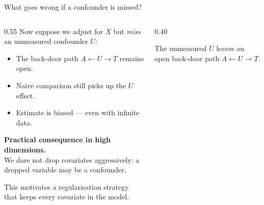 \documentclass[10pt,aspectratio=169]{beamer}
\begin{document}
\begin{frame}{What goes wrong if a confounder is missed?}
\begin{columns}[T,onlytextwidth]
\begin{column}{0.55\textwidth}
Now suppose we adjust for $X$ but \emph{miss} an unmeasured confounder $U$:

\bigskip

\begin{itemize}
  \item The back-door path $A \leftarrow U \rightarrow T$ remains open.
  \item Naive comparison still picks up the $U$ effect.
  \item \alert{Estimate is biased — even with infinite data.}
\end{itemize}

\bigskip

\textbf{Practical consequence in high dimensions.}\\
We dare not drop covariates aggressively: a dropped variable may be a confounder.

\bigskip

This motivates a regularisation strategy that \alert{keeps every covariate in the model}.
\end{column}
\begin{column}{0.40\textwidth}
\centering
{}

\vspace{0.4cm}
{\footnotesize The unmeasured $U$ leaves an open back-door path $A \leftarrow U \rightarrow T$.}
\end{column}
\end{columns}
\end{frame}
\end{document}
